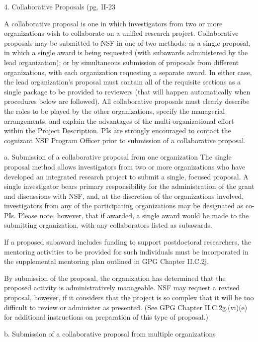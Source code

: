 \documentclass[pdftex,12pt,fullpage,oneside]{amsart}
\begin{document}
4. Collaborative Proposals  (pg. II-23

A collaborative proposal is one in which investigators from two or
more organizations wish to collaborate on a unified research project.
Collaborative proposals may be submitted to NSF in one of two methods:
as a single proposal, in which a single award is being requested (with
subawards administered by the lead organization); or by simultaneous
submission of proposals from different organizations, with each
organization requesting a separate award.  In either case, the lead
organization’s proposal must contain all of the requisite sections as
a single package to be provided to reviewers (that will happen
automatically when procedures below are followed).  All collaborative
proposals must clearly describe the roles to be played by the other
organizations, specify the managerial arrangements, and explain the
advantages of the multi-organizational effort within the Project
Description.  PIs are strongly encouraged to contact the cognizant NSF
Program Officer prior to submission of a collaborative proposal.

a. Submission of a collaborative proposal from one organization The
single proposal method allows investigators from two or more
organizations who have developed an integrated research project to
submit a single, focused proposal.  A single investigator bears
primary responsibility for the administration of the grant and
discussions with NSF, and, at the discretion of the organizations
involved, investigators from any of the participating organizations
may be designated as co-PIs.  Please note, however, that if awarded, a
single award would be made to the submitting organization, with any
collaborators listed as subawards.

If a proposed subaward includes funding to support postdoctoral
researchers, the mentoring activities to be provided for such
individuals must be incorporated in the supplemental mentoring plan
outlined in GPG Chapter II.C.2j.

By submission of the proposal, the organization has determined that
the proposed activity is administratively manageable.  NSF may request
a revised proposal, however, if it considers that the project is so
complex that it will be too difficult to review or administer as
presented.  (See GPG Chapter II.C.2g.(vi)(e) for additional
instructions on preparation of this type of proposal.)

 b. Submission of a collaborative proposal from multiple organizations
\end{document}
